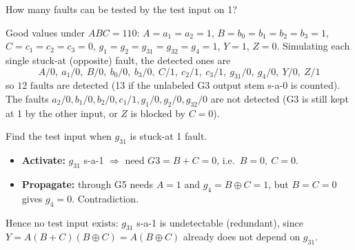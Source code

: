 \documentclass[a4paper, 10pt]{article}
\begin{document}
\begin{problem}
How many faults can be tested by the test input on 1?
\end{problem}

\begin{solution}
	\noindent Good values under \( ABC=110 \): \( A=a_1=a_2=1 \), \( B=b_0=b_1=b_2=b_3=1 \),
	\( C=c_1=c_2=c_3=0 \), \( g_1=g_2=g_{31}=g_{32}=g_4=1 \), \( Y=1 \), \( Z=0 \).
	Simulating each single stuck-at (opposite) fault, the detected ones are
	\[
		A/0,\ a_1/0,\ B/0,\ b_0/0,\ b_3/0,\ C/1,\ c_2/1,\ c_3/1,\ g_{31}/0,\ g_4/0,\ Y/0,\ Z/1
	\]
	so \( \boxed{12 \text{ faults}} \) are detected (13 if the unlabeled G3 output stem s-a-0 is counted).
	The faults \( a_2/0, b_1/0, b_2/0, c_1/1, g_1/0, g_2/0, g_{32}/0 \) are not detected
	(G3 is still kept at 1 by the other input, or \( Z \) is blocked by \( C=0 \)).
\end{solution}

\begin{problem}
Find the test input when \( g_{31} \) is stuck-at 1 fault.
\end{problem}

\begin{solution}
	\begin{itemize}
		\item \textbf{Activate:} \( g_{31} \) s-a-1 \( \Rightarrow \) need \( G3=B+C=0 \), i.e.\ \( B=0,\ C=0 \).
		\item \textbf{Propagate:} through G5 needs \( A=1 \) and \( g_4=B\oplus C=1 \),
		      but \( B=C=0 \) gives \( g_4=0 \). Contradiction.
	\end{itemize}
	Hence \( \boxed{\text{no test input exists}} \): \( g_{31} \) s-a-1 is undetectable (redundant),
	since \( Y = A(B+C)(B\oplus C) = A(B\oplus C) \) already does not depend on \( g_{31} \).
\end{solution}
\end{document}
